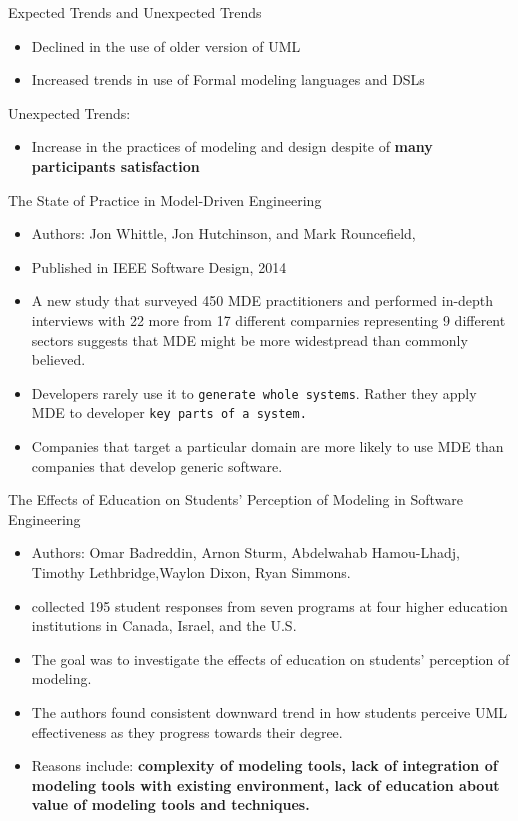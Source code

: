 \documentclass[slidetop,mathserif,red]{beamer}
\begin{document}
\begin{frame}{Expected Trends and Unexpected Trends}
\begin{itemize}
	\item Declined in the use of older version of UML
	\item Increased trends in use of Formal modeling languages and DSLs
\end{itemize}

Unexpected Trends:
\begin{itemize}
	\item Increase in the practices of modeling and design despite of \textbf{many participants satisfaction}
\end{itemize}
\end{frame}

\begin{frame}{The State of Practice in Model-Driven Engineering}
\begin{itemize}
	\item \tiny Authors: Jon Whittle, Jon Hutchinson, and Mark Rouncefield,
	\item \tiny Published in IEEE Software Design, 2014
	\item \small A new study that surveyed 450 MDE practitioners and performed in-depth interviews with 22 more from 17 different comparnies representing 9 different sectors suggests that MDE might be more widestpread than commonly believed. 
	\item Developers rarely use it to \texttt{generate whole systems}. Rather they apply \textsc{MDE} to developer \texttt{key parts of a system.}
	\item Companies that target a particular domain are more likely to use MDE than companies that develop generic software.
\end{itemize}
\end{frame}

\begin{frame}{The Effects of Education on Students’ Perception of Modeling in Software Engineering}
\begin{itemize}
	\item \tiny Authors: Omar Badreddin, Arnon Sturm, Abdelwahab Hamou-Lhadj, Timothy Lethbridge,Waylon Dixon, Ryan Simmons. 
	\item \tiny collected 195 student responses from seven programs at four higher education institutions in Canada, Israel, and the U.S. 
	\item \small The goal was to investigate the effects of education on students’ perception of modeling. 
	\item \small The authors found consistent downward trend in how students perceive UML effectiveness as they progress towards their degree.
	\item Reasons include: \textbf{complexity of modeling tools, lack of integration of modeling tools with existing environment, lack of education about value of modeling tools and techniques.} 
\end{itemize}
\end{frame}
\end{document}
